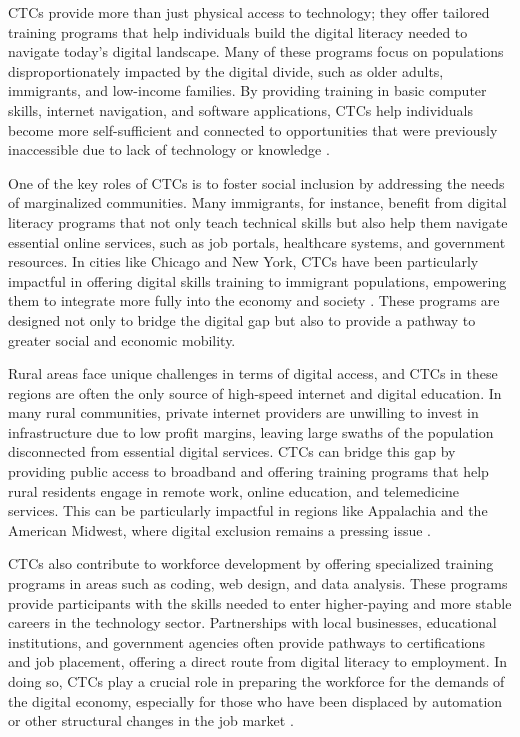 \begin{refsection}
CTCs provide more than just physical access to technology; they offer tailored training programs that help individuals build the digital literacy needed to navigate today’s digital landscape. Many of these programs focus on populations disproportionately impacted by the digital divide, such as older adults, immigrants, and low-income families. By providing training in basic computer skills, internet navigation, and software applications, CTCs help individuals become more self-sufficient and connected to opportunities that were previously inaccessible due to lack of technology or knowledge \cite[pp.~56-59]{fuchsinternet}.

One of the key roles of CTCs is to foster social inclusion by addressing the needs of marginalized communities. Many immigrants, for instance, benefit from digital literacy programs that not only teach technical skills but also help them navigate essential online services, such as job portals, healthcare systems, and government resources. In cities like Chicago and New York, CTCs have been particularly impactful in offering digital skills training to immigrant populations, empowering them to integrate more fully into the economy and society \cite[pp.~34-37]{eubanksautomating}. These programs are designed not only to bridge the digital gap but also to provide a pathway to greater social and economic mobility.

Rural areas face unique challenges in terms of digital access, and CTCs in these regions are often the only source of high-speed internet and digital education. In many rural communities, private internet providers are unwilling to invest in infrastructure due to low profit margins, leaving large swaths of the population disconnected from essential digital services. CTCs can bridge this gap by providing public access to broadband and offering training programs that help rural residents engage in remote work, online education, and telemedicine services. This can be particularly impactful in regions like Appalachia and the American Midwest, where digital exclusion remains a pressing issue \cite[pp.~45-48]{eubanksautomating}.

CTCs also contribute to workforce development by offering specialized training programs in areas such as coding, web design, and data analysis. These programs provide participants with the skills needed to enter higher-paying and more stable careers in the technology sector. Partnerships with local businesses, educational institutions, and government agencies often provide pathways to certifications and job placement, offering a direct route from digital literacy to employment. In doing so, CTCs play a crucial role in preparing the workforce for the demands of the digital economy, especially for those who have been displaced by automation or other structural changes in the job market \cite[pp.~120-123]{schillerdigitalcapitalism}.


\end{refsection}
